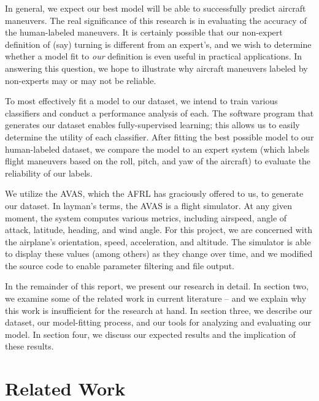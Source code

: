 \documentclass[11pt]{article}
\begin{document}

In general, we expect our best model will be able to successfully predict aircraft maneuvers. The real significance of this research is in evaluating the accuracy of the human-labeled maneuvers. It is certainly possible that our non-expert definition of (say) turning is different from an expert's, and we wish to determine whether a model fit to \textit{our} definition is even useful in practical applications. In answering this question, we hope to illustrate why aircraft maneuvers labeled by non-experts may or may not be reliable.


To most effectively fit a model to our dataset, we intend to train various classifiers and conduct a performance analysis of each. The software program that generates our dataset enables fully-supervised learning; this allows us to easily determine the utility of each classifier. After fitting the best possible model to our human-labeled dataset, we compare the model to an expert system (which labels flight maneuvers based on the roll, pitch, and yaw of the aircraft) to evaluate the reliability of our labels.


We utilize the \ac{AVAS}, which the \ac{AFRL} has graciously offered to us, to generate our dataset. In layman's terms, the \ac{AVAS} is a flight simulator. At any given moment, the system computes various metrics, including airspeed, angle of attack, latitude, heading, and wind angle. For this project, we are concerned with the airplane's orientation, speed, acceleration, and altitude. The simulator is able to display these values (among others) as they change over time, and we modified the source code to enable parameter filtering and file output.


In the remainder of this report, we present our research in detail. In section two, we examine some of the related work in current literature -- and we explain why this work is insufficient for the research at hand. In section three, we describe our dataset, our model-fitting process, and our tools for analyzing and evaluating our model. In section four, we discuss our expected results and the implication of these results.

\section{Related Work}
\end{document}

